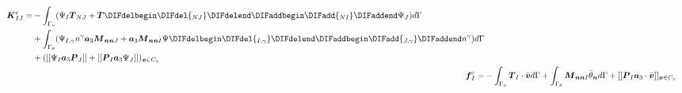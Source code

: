 \begin{subequations}
\begin{align}
\begin{split}
\boldsymbol K^c_{IJ} = &- \int_{\Gamma_v} (\Psi_I \boldsymbol T_{NJ} + \boldsymbol T\DIFdelbegin \DIFdel{_{NJ} }\DIFdelend \DIFaddbegin \DIFadd{_{NI} }\DIFaddend \Psi_J) d\Gamma \\
                                     &+ \int_{\Gamma_\theta} (\Psi_{I,\gamma} n^\gamma \boldsymbol a_3 \boldsymbol M_{\boldsymbol{nn}J} + \boldsymbol a_3 \boldsymbol M_{\boldsymbol{nn}I} \Psi\DIFdelbegin \DIFdel{_{I,\gamma}}\DIFdelend \DIFaddbegin \DIFadd{_{J,\gamma}}\DIFaddend n^\gamma)d\Gamma \\
                                     & + ([[\Psi_I \boldsymbol a_3 \boldsymbol P_J]] + [[\boldsymbol P_I \boldsymbol a_3 \Psi_J]])_{\boldsymbol x \in C_v}
\end{split} \\
\boldsymbol f^c_I = &- \int_{\Gamma_v} \boldsymbol T_I \cdot \bar{\boldsymbol v} d\Gamma + \int_{\Gamma_\theta} \boldsymbol M_{\boldsymbol{nn}I} \bar{\theta}_{\boldsymbol n} d\Gamma + [[\boldsymbol P_I\boldsymbol a_3 \cdot \bar{\boldsymbol v}]]_{\boldsymbol x \in C_v}
\end{align}
\end{subequations}
